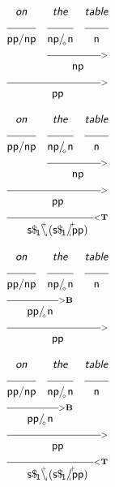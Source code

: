 \documentclass{article}
\newcommand{\deriv}[2]
{  \renewcommand{\arraystretch}{.5}
$\begin{array}[t]{*{#1}{c}}
     #2
   \end{array}$ }
\newcommand{\gf}[1]{\textsf{\textsl{#1}}}
\newcommand{\cf}[1]{\mbox{\ensuremath{\cfont{#1}}}}
\newcommand{\uline}[1]
{\mc{#1}{\hrulefill} }
\newcommand{\mc}[2]
  {\multicolumn{#1}{c}{#2}}
\newcommand{\cfont}{\mathsf}
\newcommand{\bs}{\backslash}
\newcommand{\subsa}[1]{\hspace{-0.75mm}_{_{#1}}}
\newcommand{\subsb}[1]{\hspace{-0.10mm}_{_{#1}}}
\newcommand{\subs}[1]{\hspace{-0.40mm}_{#1}}
\newcommand{\supsa}[1]{\hspace{-1.75mm}^{^{#1}} }
\newcommand{\supsb}[1]{\hspace{-0.80mm}^{^{#1}}  }
\begin{document}
\deriv{3}{
\gf{on} & \gf{the} & \gf{table} \\
\uline{1} & \uline{1} & \uline{1} \\
\cf{pp/ np} & \cf{np/ \subsa{\diamond} n} & \cf{n} \\
& \mc{2} {\hrulefill_{>}} \\
& \mc{2}{\cf{np}} \\
 \mc{3} {\hrulefill_{>}} \\
 \mc{3}{\cf{pp}} \\
}

\vspace{5mm}

\deriv{3}{
\gf{on} & \gf{the} & \gf{table} \\
\uline{1} & \uline{1} & \uline{1} \\
\cf{pp/ np} & \cf{np/ \subsa{\diamond} n} & \cf{n} \\
& \mc{2} {\hrulefill_{>}} \\
& \mc{2}{\cf{np}} \\
 \mc{3} {\hrulefill_{>}} \\
 \mc{3}{\cf{pp}} \\
 \mc{3} {\hrulefill_{<\mathbf{T}}}\\
 \mc{3}{\cf{s\$ \subs{1}\bs \supsa{+} \hspace{-0.50mm} \subsb{i} (s\$ \subs{1}/ \supsb{+} \hspace{-1.45mm} \subsa{i} pp)}} \\
}

\vspace{5mm}

\deriv{3}{
\gf{on} & \gf{the} & \gf{table} \\
\uline{1} & \uline{1} & \uline{1} \\
\cf{pp/ np} & \cf{np/ \subsa{\diamond} n} & \cf{n} \\
 \mc{2} {\hrulefill_{>\mathbf{B}}}\\
 \mc{2}{\cf{pp/ \subsa{\diamond} n}} \\
 \mc{3} {\hrulefill_{>}} \\
 \mc{3}{\cf{pp}} \\
}

\vspace{5mm}

\deriv{3}{
\gf{on} & \gf{the} & \gf{table} \\
\uline{1} & \uline{1} & \uline{1} \\
\cf{pp/ np} & \cf{np/ \subsa{\diamond} n} & \cf{n} \\
 \mc{2} {\hrulefill_{>\mathbf{B}}}\\
 \mc{2}{\cf{pp/ \subsa{\diamond} n}} \\
 \mc{3} {\hrulefill_{>}} \\
 \mc{3}{\cf{pp}} \\
 \mc{3} {\hrulefill_{<\mathbf{T}}}\\
 \mc{3}{\cf{s\$ \subs{1}\bs \supsa{+} \hspace{-0.50mm} \subsb{i} (s\$ \subs{1}/ \supsb{+} \hspace{-1.45mm} \subsa{i} pp)}} \\
}

\vspace{5mm}
\end{document}
